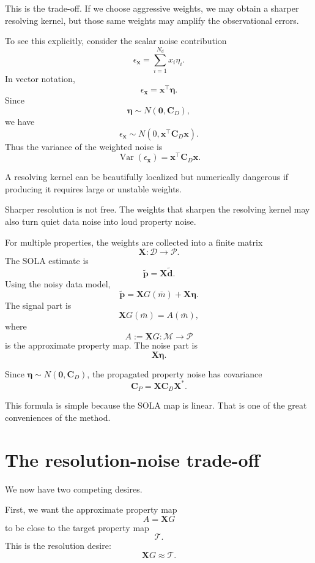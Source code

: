 \documentclass[11pt,openany]{book}
\theoremstyle{definition}
\theoremstyle{remark}
\newcommand{\M}{\mathcal M}
\newcommand{\D}{\mathcal D}
\newcommand{\Pspace}{\mathcal P}
\newcommand{\Tau}{\mathcal{T}}
\begin{document}
This is the trade-off. If we choose aggressive weights, we may obtain a sharper resolving kernel,
but those same weights may amplify the observational errors.

To see this explicitly, consider the scalar noise contribution
\[
  \epsilon_{\mathbf x}
  =
  \sum_{i=1}^{N_d}x_i\eta_i.
\]
In vector notation,
\[
  \epsilon_{\mathbf x}
  =
  \mathbf x^\top\boldsymbol\eta.
\]
Since
\[
  \boldsymbol\eta\sim N(\mathbf 0,\mathbf C_D),
\]
we have
\[
  \epsilon_{\mathbf x}\sim N(0,\mathbf x^\top\mathbf C_D\mathbf x).
\]
Thus the variance of the weighted noise is
\[
  \operatorname{Var}(\epsilon_{\mathbf x})
  =
  \mathbf x^\top\mathbf C_D\mathbf x.
\]

A resolving kernel can be beautifully localized but numerically dangerous if producing it requires
large or unstable weights.

\begin{warningbox}
Sharper resolution is not free. The weights that sharpen the resolving kernel may also turn
quiet data noise into loud property noise.
\end{warningbox}

For multiple properties, the weights are collected into a finite matrix
\[
  \mathbf X:\D\to\Pspace.
\]
The SOLA estimate is
\[
  \widetilde{\mathbf p}
  =
  \mathbf X\widetilde{\mathbf d}.
\]
Using the noisy data model,
\[
  \widetilde{\mathbf p}
  =
  \mathbf XG(\bar m)+\mathbf X\boldsymbol\eta.
\]
The signal part is
\[
  \mathbf XG(\bar m)=A(\bar m),
\]
where
\[
  A:=\mathbf XG:\M\to\Pspace
\]
is the approximate property map. The noise part is
\[
  \mathbf X\boldsymbol\eta.
\]

Since \(\boldsymbol\eta\sim N(\mathbf 0,\mathbf C_D)\), the propagated property noise has
covariance
\[
  \mathbf C_P
  =
  \mathbf X\mathbf C_D\mathbf X^*.
\]

This formula is simple because the SOLA map is linear. That is one of the great conveniences of
the method.

\section{The resolution-noise trade-off}

We now have two competing desires.

First, we want the approximate property map
\[
  A=\mathbf XG
\]
to be close to the target property map
\[
  \Tau.
\]
This is the resolution desire:
\[
  \mathbf XG\approx \Tau.
\]
\end{document}
